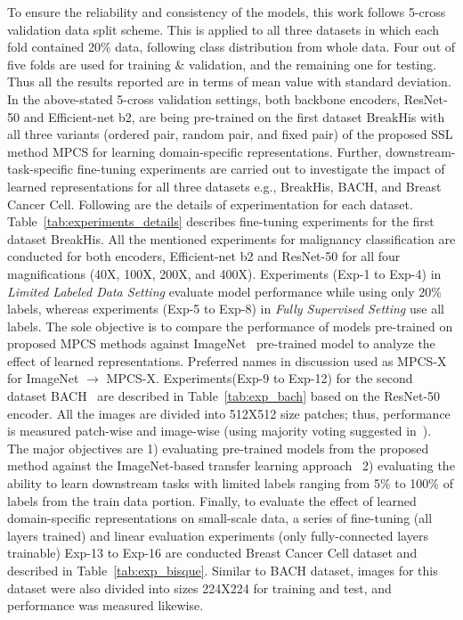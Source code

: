 \documentclass[conference]{IEEEtran}
\begin{document}
To ensure the reliability and consistency of the models, this work follows 5-cross validation data split scheme. This is applied to all three datasets in which each fold contained 20\% data, following class distribution from whole data. Four out of five folds are used for training \& validation, and the remaining one for testing. Thus all the results reported are in terms of mean value with standard deviation.
In the above-stated 5-cross validation settings, both backbone encoders, ResNet-50 and Efficient-net b2, are being pre-trained on the first dataset BreakHis with all three variants (ordered pair, random pair, and fixed pair) of the proposed SSL method MPCS for learning domain-specific representations. Further, downstream-task-specific fine-tuning experiments are carried out to investigate the impact of learned representations for all three datasets e.g., BreakHis, BACH, and Breast Cancer Cell. 
Following are the details of experimentation for each dataset.
Table~\ref{tab:experiments_details} describes fine-tuning experiments for the first dataset BreakHis. All the mentioned experiments for malignancy classification are conducted for both encoders, Efficient-net b2 and ResNet-50 for all four magnifications (40X, 100X, 200X, and 400X). Experiments (Exp-1 to Exp-4) in \textit{Limited Labeled Data Setting} evaluate model performance while using only 20\% labels, whereas experiments (Exp-5 to Exp-8) in \textit{Fully Supervised Setting} use all labels. The sole objective is to compare the performance of models pre-trained on proposed MPCS methods against ImageNet~\cite{deng2009imagenet} pre-trained model to analyze the effect of learned representations. Preferred names in discussion used as MPCS-X for ImageNet $\to$ MPCS-X.
Experiments(Exp-9 to Exp-12) for the second dataset BACH~\cite{aresta2019bach} are described in Table~\ref{tab:exp_bach} based on the ResNet-50 encoder. All the images are divided into 512X512 size patches; thus, performance is measured patch-wise and image-wise (using majority voting suggested in~\cite{vesal2018classification}). The major objectives are 1) evaluating pre-trained models from the proposed method against the ImageNet-based transfer learning approach~\cite{aresta2019bach} 2) evaluating the ability to learn downstream tasks with limited labels ranging from 5\% to 100\% of labels from the train data portion.
Finally, to evaluate the effect of learned domain-specific representations on small-scale data, a series of fine-tuning (all layers trained) and linear evaluation experiments (only fully-connected layers trainable) Exp-13 to Exp-16 are conducted Breast Cancer Cell dataset and described in Table~\ref{tab:exp_bisque}. Similar to BACH dataset, images for this dataset were also divided into sizes 224X224 for training and test, and performance was measured likewise.
\end{document}
